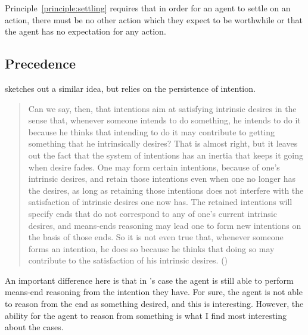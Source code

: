 \documentclass[10pt]{article}
\begin{document}
Principle~\ref{principle:settling} requires that in order for an agent to settle on an action, there must be no other action which they expect to be worthwhile or that the agent has no expectation for any action.


\subsection{Precedence}
\label{sec:precedence}

\citeauthor{Harman:1976aa} sketches out a similar idea, but relies on the persistence of intention.

\begin{quote}
  Can we say, then, that intentions aim at satisfying intrinsic desires in the sense that, whenever someone intends to do something, he intends to do it because he thinks that intending to do it may contribute to getting something that he intrinsically desires?
  That is almost right, but it leaves out the fact that the system of intentions has an inertia that keeps it going when desire fades.
  One may form certain intentions, because of one’s intrinsic desires, and retain those intentions even when one no longer has the desires, as long as retaining those intentions does not interfere with the satisfaction of intrinsic desires one now has.
  The retained intentions will specify ends that do not correspond to any of one’s current intrinsic desires, and means-ends reasoning may lead one to form new intentions on the basis of those ends.
  So it is not even true that, whenever someone forms an intention, he does so because he thinks that doing so may contribute to the satisfaction of his intrinsic desires.\nolinebreak
  \mbox{}\hfill\mbox{(\citeyear[450--451]{Harman:1976aa})}
\end{quote}

An important difference here is that in \citeauthor{Harman:1976aa}'s case the agent is still able to perform means-end reasoning from the intention they have.
For sure, the agent is not able to reason from the end as something desired, and this is interesting.
However, the ability for the agent to reason from something is what I find most interesting about the cases.
\end{document}
